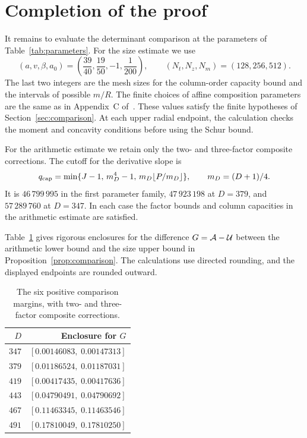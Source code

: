 \section{Completion of the proof}\label{sec:completion}
It remains to evaluate the determinant comparison at the parameters of
Table~\ref{tab:parameters}. For the size estimate we use
\begin{equation}\label{eq:spectral-parameters}
 (a,v,\beta,a_0)=\left(\frac{39}{40},\frac{19}{50},-1,\frac1{200}\right),
 \qquad (N_t,N_z,N_m)=(128,256,512).
\end{equation}
The last two integers are the mesh sizes for the column-order capacity
bound and the intervals of possible $m/R$. The finite choices of affine
composition parameters are the same as in Appendix~C of~\cite{chung498}. These values satisfy the finite hypotheses of
Section~\ref{sec:comparison}. At each upper radial endpoint, the
calculation checks the moment and concavity conditions before using the
Schur bound.


For the arithmetic estimate we retain only the two- and three-factor
composite corrections. The cutoff for the derivative slope is
\[
 q_{\rm cap}=\min\{J-1,\,m_D^4-1,\,m_D\lfloor P/m_D\rfloor\},
 \qquad m_D=(D+1)/4.
\]
It is $46\,799\,995$ in the first parameter family, $47\,923\,198$ at
$D=379$, and $57\,289\,760$ at $D=347$. In each case the factor bounds
and column capacities in the arithmetic estimate are satisfied.

Table~\ref{tab:gaps} gives rigorous enclosures for the difference
$G=\mathcal A-\mathcal U$ between the arithmetic lower bound and the size upper
bound in Proposition~\ref{prop:comparison}. The calculations use directed
rounding, and the displayed endpoints are rounded outward.
\begin{table}[ht]
\centering
\begin{tabular}{rr}
\toprule
$D$ & Enclosure for $G$\\
\midrule
$347$ & $[0.00146083,\;0.00147313]$\\
$379$ & $[0.01186524,\;0.01187031]$\\
$419$ & $[0.00417435,\;0.00417636]$\\
$443$ & $[0.04790491,\;0.04790692]$\\
$467$ & $[0.11463345,\;0.11463546]$\\
$491$ & $[0.17810049,\;0.17810250]$\\
\bottomrule
\end{tabular}
\caption{The six positive comparison margins, with two- and three-factor
composite corrections.}
\label{tab:gaps}
\end{table}

